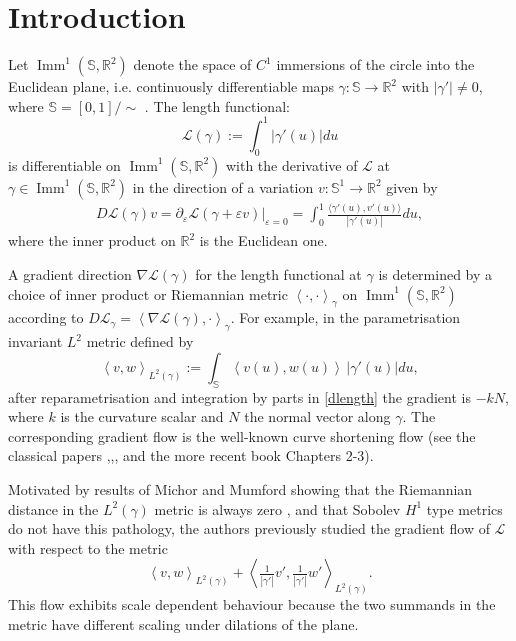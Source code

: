\documentclass[a4paper,11pt]{amsart}
\theoremstyle{definition}\newtheorem*{definition}{Definition}
\theoremstyle{definition} \newtheorem{proposition}[theorem]{Proposition}
\theoremstyle{definition}\newtheorem{lemma}[theorem]{Lemma}
\theoremstyle{definition}\newtheorem{corollary}[theorem]{Corollary}
\theoremstyle{definition}\newtheorem{example}{Example}
\theoremstyle{remark}\newtheorem*{remark}{Remark}
\newcommand{\IM}{\imm^{1}(\S,\R^2)}
\def\R{\mathbb{R}}
\def\S{\mathbb{S}}
\newcommand{\enorm}[1]{{\left | {#1}\right |}}
\newcommand{\ip}[1]{{\left \langle {#1} \right \rangle}}
\newcommand{\abs}[1]{\left | {#1}\right |}
\DeclareMathOperator{\imm}{Imm}
\def\length{\mathcal L}
\renewcommand{\L}{\length}
\begin{document}
\maketitle

\section{Introduction}
Let $\imm^{1}(\S,\R^2)$ denote the space of $C^1$ immersions of the circle into the Euclidean plane, i.e. continuously differentiable maps $\gamma:\S\to \R^2$ with $|\gamma'|\ne0$, where $\S=[0,1]/{\sim}$ . The length functional:
\begin{equation*}
\length(\gamma):=\int_0^1 \enorm{\gamma'(u)}du \end{equation*}
is differentiable on $\imm^{1}(\S,\R^2)$ with the derivative of $\length$ at $\gamma\in \IM$ in the direction of a variation $v: \S^1 \to \R^2$ given by
\begin{equation}
\begin{split}
D\length(\gamma) v = {\left .  \partial_\varepsilon \length(\gamma+\varepsilon v) \right |}_{\varepsilon=0}
 \label{dlength}
=\int_0^1 \frac{\langle\gamma'(u),v'(u)\rangle}{\abs{\gamma'(u)}} du, 
\end{split}
\end{equation}
where the inner product on $\R^2$ is the Euclidean one.

A gradient direction $\nabla \length(\gamma)$ for the length functional at $\gamma$ is determined by a choice of inner product or Riemannian metric $\ip{\cdot,\cdot}_\gamma$ on $\IM $ according to $ D\L_\gamma=\ip{\nabla\length(\gamma), \cdot}_\gamma$. For example, in the parametrisation invariant $L^2$ metric defined by
\[
\ip{v,w}_{L^2(\gamma)}:=\int_{\S} \ip{v(u),w(u)}\, |\gamma'(u)| du,
\]
after reparametrisation and integration by parts in \eqref{dlength} the gradient is $-kN$, where $k$ is the curvature scalar and $N$ the normal vector along $\gamma$. The corresponding gradient flow is the well-known curve shortening flow (see the classical papers \cite{GH},\cite{Gage:1983aa},\cite{Gray}, and the more recent book \cite{Andrews:2020aa} Chapters 2-3).

Motivated by results of Michor and Mumford showing that the Riemannian distance in the $L^2(\gamma)$ metric is always zero \cite{MR2201275}, and that Sobolev $H^1$ type metrics do not have this pathology, the authors previously studied \cite{schrader2023h} the gradient flow of $\length$ with respect to the metric 
\[{\ip{v,w}_{L^2(\gamma)}+\ip{\tfrac{1}{\abs{\gamma'}} v',\tfrac{1}{\abs{\gamma'}} w'} _{L^2(\gamma)}}.\] 
This flow exhibits scale dependent behaviour because the two summands in the metric have different scaling under dilations of the plane. 
\end{document}

